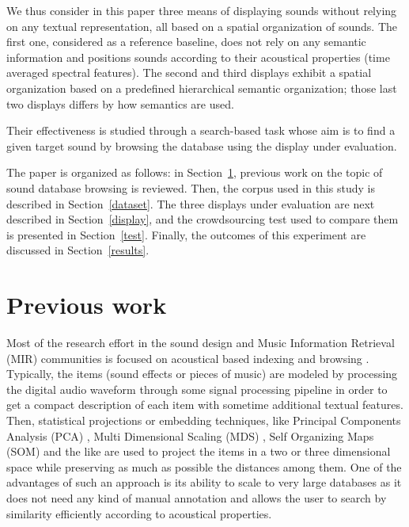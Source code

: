 \documentclass{aes2e}
\begin{document}
We thus consider in this paper three means of displaying sounds without relying on any textual representation, all based on a spatial organization of sounds. The first one, considered as a reference baseline, does not rely on any semantic information and positions sounds according to their acoustical properties (time averaged spectral features). The second and third displays exhibit a spatial organization based  on a predefined hierarchical semantic organization; those last two displays differs by how semantics are used.

Their effectiveness is studied through a search-based task whose aim is to find a given target sound by browsing the database using the display under evaluation.

The paper is organized as follows: in Section~\ref{previous}, previous work on the topic of sound database browsing is reviewed. Then, the corpus used in this study is described in Section~\ref{dataset}. The three displays under evaluation are next described in Section~\ref{display}, and the crowdsourcing test used to compare them is presented in Section~\ref{test}. Finally, the outcomes of this experiment are discussed in Section~\ref{results}.  

\section{Previous work} \label{previous}

Most of the research effort in the sound design and Music Information Retrieval (MIR) communities is focused on acoustical based indexing and browsing \cite{tzanetakis2003musescape, streich2008music,goto2005musicream,pampalk2007musicsun}. Typically, the items (sound effects or pieces of music) are modeled by processing the digital audio waveform through some signal processing pipeline in order to get a compact description of each item
\cite{coleman2007mused} with sometime additional textual features. Then, statistical projections or embedding techniques, like Principal Components Analysis (PCA) \cite{MusicBox},  Multi Dimensional Scaling (MDS) \cite{schwarz2009sound,Cano2002}, Self Organizing Maps (SOM) \cite{pampalk2004exploring,pampalk2006musicrainbow,knees2006innovative} and the like are used to project the items in a two or three dimensional space while preserving as much as possible the distances among them. One of the advantages of such an approach is its ability to scale to very large databases \cite{schwarz2009scalability} as it does not need any kind of manual annotation and allows the user to search by similarity efficiently according to acoustical properties.
\end{document}
